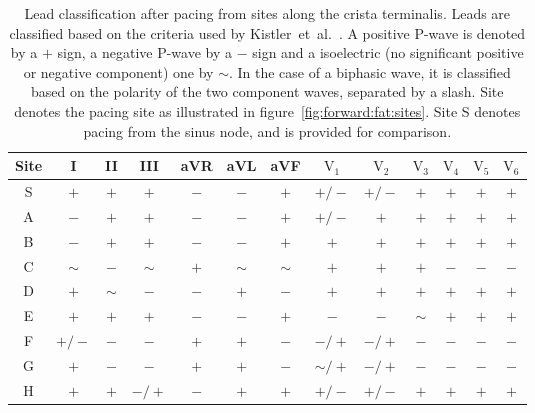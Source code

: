 \begin{table}
\caption[Lead classification from pacing sites through the atria]{
\label{tbl:forward:fat:ecgs}
Lead classification after pacing from sites along the crista terminalis.
Leads are classified based on the criteria used by
Kistler~et~al.~\cite{Kistler2006}.
A positive P-wave is denoted by a $+$ sign, a negative P-wave by a $-$ sign and
a isoelectric (no significant positive or negative component) one by $\sim$.
In the case of a biphasic wave, it is classified based on the polarity of the
two component waves, separated by a slash.
Site denotes the pacing site as illustrated in figure~\ref{fig:forward:fat:sites}.
Site S denotes pacing from the sinus node, and is provided for comparison.
}
\begin{center}
\begin{tabular}{c c c c c c c c c c c c c}
\toprule
Site & I & II & III & aVR & aVL & aVF & $\text{V}_{\text{1}}$ &$\text{V}_{\text{2}}$ & $\text{V}_{\text{3}}$ & $\text{V}_{\text{4}}$ & $\text{V}_{\text{5}}$ & $\text{V}_{\text{6}}$\\
\midrule
S & $+$ & $+$ & $+$ & $-$ & $-$ & $+$ & $+/-$ & $+/-$ & $+$ & $+$ & $+$ & $+$ \\
A & $-$ & $+$ & $+$ & $-$ & $-$ & $+$ & $+/-$ & $+$ & $+$ & $+$ & $+$ & $+$ \\
B & $-$ & $+$ & $+$ & $-$ & $-$ & $+$ & $+$ & $+$ & $+$ & $+$ & $+$ & $+$ \\
C & $\sim$ & $-$ & $\sim$ & $+$ & $\sim$ & $\sim$ & $+$ & $+$ & $+$ & $-$ & $-$ & $-$ \\
D & $+$ & $\sim$ & $-$ & $-$ & $+$ & $-$ & $+$ & $+$ & $+$ & $+$ & $+$ & $+$ \\
E & $+$ & $+$ & $+$ & $-$ & $-$ & $+$ & $-$ & $-$ & $\sim$ & $+$ & $+$ & $+$ \\
F & $+/-$ & $-$ & $-$ & $+$ & $+$ & $-$ & $-/+$ & $-/+$ & $-$ & $-$ & $-$ & $-$ \\
G & $+$ & $-$ & $-$ & $+$ & $+$ & $-$ & $\sim/+$ & $-/+$ & $-$ & $-$ & $-$ & $-$ \\
H & $+$ & $+$ & $-/+$ & $-$ & $+$ & $+$ & $+/-$ & $+/-$ & $+$ & $+$ & $+$ & $+$ \\
\bottomrule
\end{tabular}
\end{center}
\end{table}

